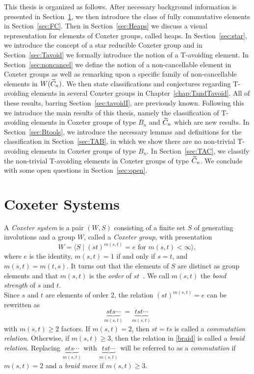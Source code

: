 This thesis is organized as follows. After necessary background information is presented in Section~\ref{sec:coxeter}, we then introduce the class of fully commutative elements in Section~\ref{sec:FC}. Then in Section~\ref{sec:Heaps} we discuss a visual representation for elements of Coxeter groups, called heaps. In Section~\ref{sec:star}, we introduce the concept of a star reducible Coxeter group and in Section~\ref{sec:Tavoid} we formally introduce the notion of a T-avoiding element. In Section~\ref{sec:noncancel} we define the notion of a non-cancellable element in Coxeter groups as well as remarking upon a specific family of non-cancellable elements in $W(\widetilde{C}_n)$. We then state classifications and conjectures regarding T-avoiding elements in several Coxeter groups in Chapter~\ref{chap:TandTavoid}. All of these results, barring Section~\ref{sec:tavoidI}, are previously known. Following this we introduce the main results of this thesis, namely the classification of T-avoiding elements in Coxeter groups of type $B_n$ and $\widetilde{C}_n$ which are new results. In Section~\ref{sec:Btools}, we introduce the necessary lemmas and definitions for the classification in Section~\ref{sec:TAB}, in which we show there are no non-trivial T-avoiding elements in Coxeter groups of type $B_n$. In Section~\ref{sec:TAC}, we classify the non-trivial T-avoiding elements in Coxeter groups of type $\widetilde{C}_n$. We conclude with some open questions in Section~\ref{sec:open}.



\section{Coxeter Systems}\label{sec:coxeter} 

A \emph{Coxeter system} is a pair $(W,S)$ consisting of a finite set $S$ of generating involutions and a group $W$, called a \emph{Coxeter group}, with presentation 
\[ 
W = \langle S \mid (st)^{m(s, t)} = e \text{ for } m(s, t) < \infty \rangle,
\]
where $e$ is the identity, $m(s,t) = 1$ if and only if $s = t$, and $m(s,t) = m(t,s)$. It turns out that the elements of $S$ are distinct as group elements and that $m(s,t)$ is the \emph\emph{order} of $st$~\cite{Humphreys1990}. We call $m(s,t)$ the \emph{bond strength} of $s$ and $t$.\\

Since $s$ and $t$ are elements of order 2, the relation $(st)^{m(s,t)}=e$ can be rewritten as
\begin{equation}\label{braid} 
	\underbrace{sts \cdots}_{m(s,t)}=\underbrace{tst\cdots}_{m(s,t)}
\end{equation}
with $m(s,t) \geq 2$ factors. If $m(s,t)=2$, then $st=ts$ is called a \emph{commutation relation}. Otherwise, if $m(s,t) \geq 3$, then the relation in \eqref{braid} is called a \emph{braid relation}. Replacing $\underbrace{sts\cdots}_{m(s,t)}$ with $\underbrace{tst\cdots}_{m(s,t)}$ will be referred to as a \emph{commutation} if $m(s,t)=2$ and a \emph{braid move} if $m(s,t) \geq 3$.\\

